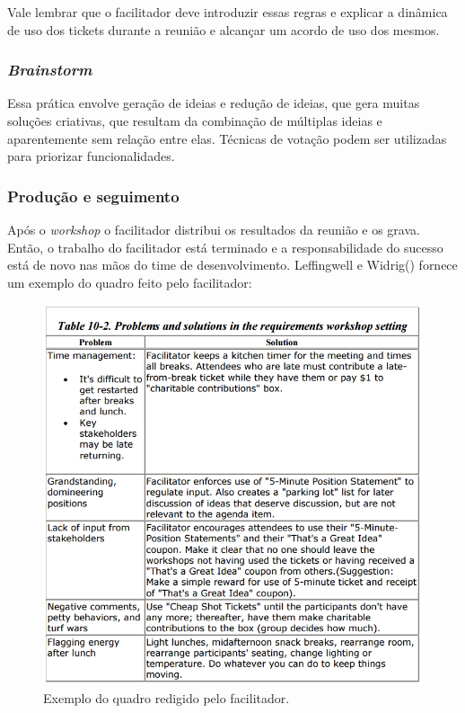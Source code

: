 	Vale lembrar que o facilitador deve introduzir essas regras e explicar a 
	dinâmica de uso dos tickets durante a reunião e alcançar um acordo de uso dos mesmos.
	
      \subsubsection{\textit{Brainstorm}}
	
	Essa prática envolve geração de ideias e redução de ideias, que gera muitas soluções criativas, 
	que resultam da combinação de múltiplas ideias e aparentemente sem relação entre elas. 
	Técnicas de votação podem ser utilizadas para priorizar funcionalidades.
      
      \subsubsection{Produção e seguimento}
      
	Após o \textit{workshop} o facilitador distribui os resultados da reunião e os grava. 
	Então, o trabalho do facilitador está terminado e a responsabilidade do sucesso está de novo nas mãos do time de desenvolvimento. 
	Leffingwell e Widrig(\citeyear{leffingwell99}) fornece um exemplo do quadro feito pelo facilitador:
	
	\begin{figure}[!htbp]
	  \centering
	  \includegraphics[scale=0.3]{editaveis/figuras/problems_solutions}
	  \caption[Exemplo do quadro redigido pelo facilitador]
	    {Exemplo do quadro redigido pelo facilitador.\footnotemark}
	  \label{problems_solutions}
	\end{figure}
	
